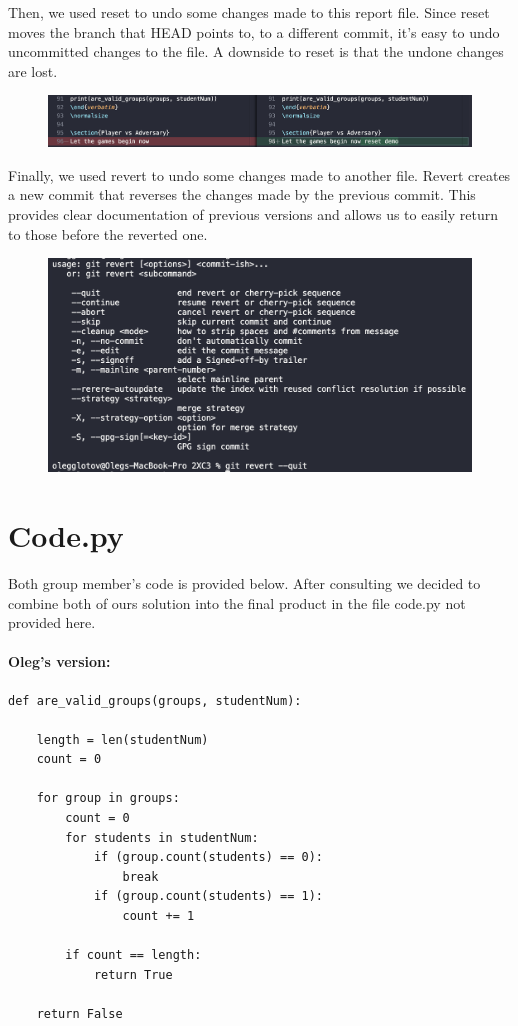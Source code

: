 \documentclass[twocolumn, 10pt]{article}
\begin{document}
Then, we used reset to undo some changes made to this report file. Since reset moves the branch that HEAD points to, to a different commit, it's easy to undo uncommitted changes to the file. A downside to reset is that the undone changes are lost.

\begin{figure}[H]
\includegraphics[width=\linewidth]{reset}
\end{figure}

Finally, we used revert to undo some changes made to another file. Revert creates a new commit that reverses the changes made by the previous commit. This provides clear documentation of previous versions and allows us to easily return to those before the reverted one.

\begin{figure}[H]
\includegraphics[width=\linewidth]{revert}
\end{figure}

\section{Code.py}

Both group member's code is provided below. After consulting we decided to combine both of ours solution into the final product in the file code.py not provided here.

\paragraph{Oleg's version:}

\footnotesize
\begin{verbatim}
def are_valid_groups(groups, studentNum):

    length = len(studentNum)
    count = 0
    
    for group in groups:
        count = 0
        for students in studentNum:
            if (group.count(students) == 0):
                break
            if (group.count(students) == 1):
                count += 1
        
        if count == length:
            return True
        
    return False
\end{verbatim}
\normalsize
\end{document}
